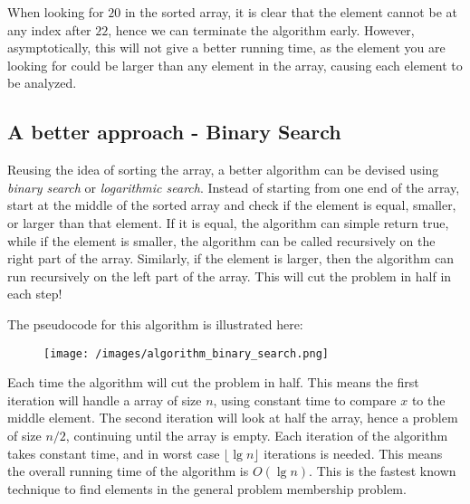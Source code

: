     When looking for $20$ in the sorted array, it is clear that the element cannot be at any index after $22$, hence we can terminate the algorithm early.
    However, asymptotically, this will not give a better running time, as the element you are looking for could be larger than any element in the array, causing each element to be analyzed.

    \subsection{A better approach - Binary Search}

        Reusing the idea of sorting the array, a better algorithm can be devised using \emph{binary search} or \emph{logarithmic search}.
        Instead of starting from one end of the array, start at the middle of the sorted array and check if the element is equal, smaller, or larger than that element.
        If it is equal, the algorithm can simple return true, while if the element is smaller, the algorithm can be called recursively on the right part of the array.
        Similarly, if the element is larger, then the algorithm can run recursively on the left part of the array.
        This will cut the problem in half in each step!


        The pseudocode for this algorithm is illustrated here:

        \begin{figure}[!h]
            \centering
            \texttt{[image: /images/algorithm\_binary\_search.png]}
        \end{figure}

        Each time the algorithm will cut the problem in half.
        This means the first iteration will handle a array of size $n$, using constant time to compare $x$ to the middle element.
        The second iteration will look at half the array, hence a problem of size $n/2$, continuing until the array is empty.
        Each iteration of the algorithm takes constant time, and in worst case $\lfloor\lg n \rfloor$ iterations is needed.
        This means the overall running time of the algorithm is $O(\lg n)$.
        This is the fastest known technique to find elements in the general problem membership problem.


